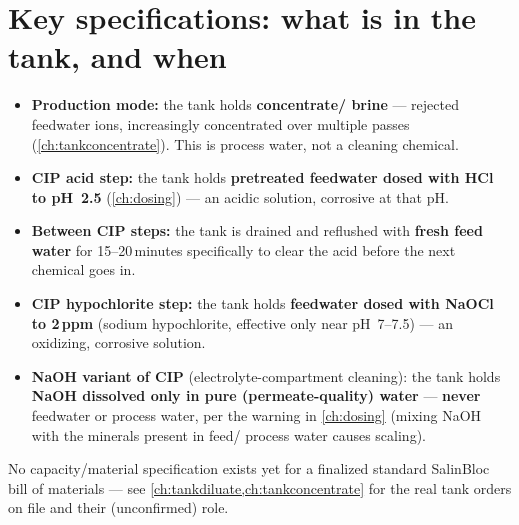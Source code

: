 \documentclass[a4paper,11pt,twoside,openright,numbers=noenddot]{scrreprt}
\newcommand{\salinbloc}{SalinBloc\texttrademark\xspace}
\begin{document}
\section{Key specifications: what is in the tank, and when}
\begin{itemize}
\item \textbf{Production mode:} the tank holds \textbf{concentrate/
  brine} --- rejected feedwater ions, increasingly concentrated over
  multiple passes (\cref{ch:tankconcentrate}). This is process water, not
  a cleaning chemical.
\item \textbf{CIP acid step:} the tank holds \textbf{pretreated feedwater
  dosed with HCl to pH~2.5} (\cref{ch:dosing}) --- an acidic solution,
  corrosive at that pH.
\item \textbf{Between CIP steps:} the tank is drained and reflushed with
  \textbf{fresh feed water} for 15--20\,minutes specifically to clear the
  acid before the next chemical goes in.
\item \textbf{CIP hypochlorite step:} the tank holds \textbf{feedwater
  dosed with NaOCl to 2\,ppm} (sodium hypochlorite, effective only near
  pH~7--7.5) --- an oxidizing, corrosive solution.
\item \textbf{NaOH variant of CIP} (electrolyte-compartment cleaning):
  the tank holds \textbf{NaOH dissolved only in pure (permeate-quality)
  water} --- \textbf{never} feedwater or process water, per the warning
  in \cref{ch:dosing} (mixing NaOH with the minerals present in feed/
  process water causes scaling).
\end{itemize}
No capacity/material specification exists yet for a finalized standard
\salinbloc bill of materials --- see \cref{ch:tankdiluate,ch:tankconcentrate}
for the real tank orders on file and their (unconfirmed) role.
\end{document}
